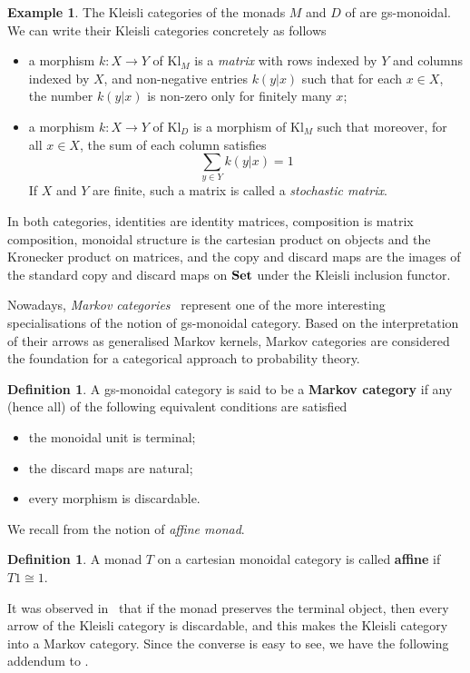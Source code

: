 \documentclass[a4paper,UKenglish,numberwithinsect,cleveref, autoref, thm-restate]{lipics-v2021}
\theoremstyle{plain} %
\theoremstyle{definition} %
\newtheorem{mydefinition}[mytheorem]{Definition}
\newtheorem{myexample}[mytheorem]{Example}
\begin{document}
\begin{myexample}\label{kleisliM}
 The Kleisli categories of the monads $M$ and $D$ of  are gs-monoidal. We can write their Kleisli categories concretely as follows
 \begin{itemize}
  \item a morphism $k:X\to Y$ of $\mathrm{Kl}_M$ is a \emph{matrix} with rows indexed by $Y$ and columns indexed by $X$, and non-negative entries $k(y|x)$ such that for each $x\in X$, the number $k(y|x)$ is non-zero only for finitely many $x$;
  \item a morphism $k:X\to Y$ of $\mathrm{Kl}_D$ is a morphism of $\mathrm{Kl}_M$ such that moreover, for all $x\in X$, the sum of each column satisfies
  \[
   \sum_{y\in Y} k(y|x) = 1 %
  \]
  If $X$ and $Y$ are finite, such a matrix is called a \emph{stochastic matrix}.
 \end{itemize}
 In both categories, identities are identity matrices, composition is matrix composition, monoidal structure is the cartesian product on objects and the Kronecker product on matrices, and the copy and discard maps are the images of the standard copy and discard maps on $\mathbf{Set}$ under the Kleisli inclusion functor.
\end{myexample}

Nowadays, \emph{Markov categories}~\cite{Fritz_2020} represent one of the more interesting specialisations of the notion of gs-monoidal category. Based on the interpretation of their arrows
 as generalised Markov kernels, Markov categories are considered the foundation for a categorical approach to probability theory.

\begin{mydefinition}
 A gs-monoidal category is said to be a \textbf{Markov category} if any (hence all) of the following equivalent conditions are satisfied
 \begin{itemize}
  \item the monoidal unit is terminal;
  \item the discard maps are natural;
  \item every morphism is discardable.
 \end{itemize}
 
\end{mydefinition}
%
We recall from \cite{Kock71,Jacobs1994} the notion of \emph{affine monad}.

\begin{mydefinition}
 A monad $T$ on a cartesian monoidal category is called \textbf{affine} if $T1\cong 1$.
\end{mydefinition}
%
It was observed in~\cite[Corollary~3.2]{Fritz_2020} that if the monad preserves the terminal object, then every arrow of the Kleisli category is discardable, and this makes the Kleisli category into a Markov category.
Since the converse is easy to see, we have the following addendum to .
\end{document}
